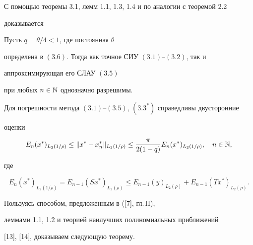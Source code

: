 С помощью теоремы 3.1, лемм 1.1, 1.3, 1.4 и по аналогии с теоремой 2.2


доказывается 





\begin{thms}


Пусть $q=\theta/4<1$, где постоянная $\theta$


определена в $(3.6)$. Тогда как точное СИУ $(3.1)$--$(3.2)$, так и


аппроксимирующая его СЛАУ $(3.5)$


при любых $n\in \Bbb N$ однозначно разрешимы.


Для погрешности метода $(3.1)$--$(3.5)$, $(3.3^*)$ справедливы двусторонние


оценки


$$


E_n(x^*)_{L_2(1/\rho)}\le \|x^*-x^*_n\|_{L_2(1/\rho)}\le


\frac{\pi}{2(1-q)}E_n(x^*)_{L_2(1/\rho)},\quad n\in\Bbb N,


$$


где


$$


E_n(x^*)_{L_2(1/\rho)}=E_{n-1}(Sx^*)_{L_2(\rho)}\le E_{n-1}(y)_{L_2(\rho)}+


E_{n-1}(Tx^*)_{L_2(\rho)}.


$$


\end{thms}





Пользуясь способом, предложенным в ([7], гл.\,II), 


леммами 1.1, 1.2 и теорией наилучших полиномиальных приближений


[13], [14], доказываем следующую теорему.





